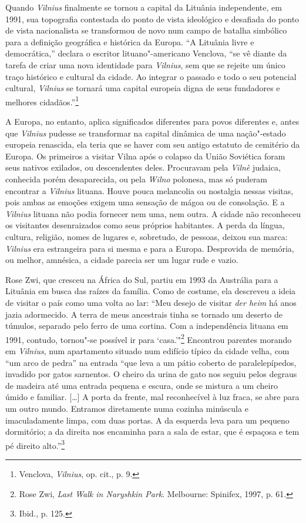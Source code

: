 Quando \textit{Vilnius} finalmente se tornou a capital da Lituânia independente,
em 1991, sua topografia contestada do ponto de vista ideológico e desafiada do ponto de vista nacionalista se transformou de novo num campo de batalha simbólico para a
definição geográfica e histórica da Europa. ``A Lituânia livre e
democrática,'' declara o escritor lituano"-americano Venclova, ``se vê
diante da tarefa de criar uma nova identidade para \textit{Vilnius}, sem que se
rejeite um único traço histórico e cultural da cidade. Ao integrar o
passado e todo o seu potencial cultural, \textit{Vilnius} se tornará uma capital
europeia digna de seus fundadores e melhores cidadãos.''\footnote{Venclova, \textit{Vilnius}, op. cit., p. 9.}
\asterisc

A Europa, no entanto, aplica significados diferentes para povos
diferentes e, antes que \textit{Vilnius} pudesse se transformar na capital
dinâmica de uma nação"-estado europeia renascida, ela teria que se haver
com seu antigo estatuto de cemitério da Europa. Os primeiros a visitar
Vilna após o colapso da União Soviética foram seus nativos exilados, ou
descendentes deles. Procuravam pela \textit{Vilnè} judaica, conhecida porém
desaparecida, ou pela \textit{Wilno} polonesa, mas só puderam encontrar a \textit{Vilnius}
lituana. Houve pouca melancolia ou nostalgia nessas visitas, pois ambas
as emoções exigem uma sensação de mágoa ou de consolação. E a \textit{Vilnius}
lituana não podia fornecer nem uma, nem outra. A cidade não reconheceu
os visitantes desenraizados como seus próprios habitantes. A perda da
língua, cultura, religião, nomes de lugares e, sobretudo, de pessoas,
deixou sua marca: \textit{Vilnius} era estrangeira para si mesma e para a Europa.
Desprovida de memória, ou melhor, amnésica, a cidade parecia ser um
lugar rude e vazio.

Rose Zwi, que cresceu na África do Sul, partiu em 1993 da Austrália para
a Lituânia em busca das raízes da família. Como de costume, ela
descreveu a ideia de visitar o país como uma volta ao lar: ``Meu desejo
de visitar \textit{der heim} há anos jazia adormecido. A terra de meus
ancestrais tinha se tornado um deserto de túmulos, separado pelo ferro
de uma cortina. Com a independência lituana em 1991, contudo, tornou"-se
possível ir para `casa.'"\footnote{Rose Zwi, \textit{Last Walk in Naryshkin Park}. Melbourne: Spinifex, 1997, p. 61.} Encontrou parentes morando em \textit{Vilnius}, num apartamento situado num edifício típico
da cidade velha, com ``um arco de pedra'' na entrada ``que leva a um
pátio coberto de paralelepípedos, invadido por gatos sarnentos. O cheiro
da urina de gato nos seguiu pelos degraus de madeira até uma entrada
pequena e escura, onde se mistura a um cheiro úmido e familiar. [\ldots{}]
A porta da frente, mal reconhecível à luz fraca, se abre para um outro
mundo. Entramos diretamente numa cozinha minúscula e imaculadamente
limpa, com duas portas. A da esquerda leva para um pequeno dormitório; a
da direita nos encaminha para a sala de estar, que é espaçosa e tem pé
direito alto.''\footnote{Ibid., p. 125.}

